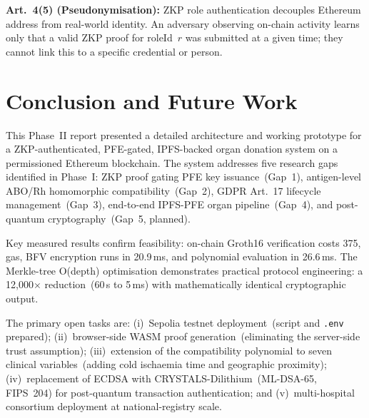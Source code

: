 \documentclass[10pt,twocolumn,a4paper]{article}
\begin{document}
\textbf{Art.~4(5) (Pseudonymisation):} ZKP role authentication decouples Ethereum
address from real-world identity. An adversary observing on-chain activity learns only
that a valid ZKP proof for roleId~$r$ was submitted at a given time; they cannot link
this to a specific credential or person.

\section{Conclusion and Future Work}
\label{sec:conclusion}

This Phase~II report presented a detailed architecture and working prototype for a
ZKP-authenticated, PFE-gated, IPFS-backed organ donation system on a permissioned
Ethereum blockchain. The system addresses five research gaps identified in Phase~I:
ZKP proof gating PFE key issuance~(Gap~1), antigen-level ABO/Rh homomorphic
compatibility~(Gap~2), GDPR Art.~17 lifecycle management~(Gap~3), end-to-end
IPFS-PFE organ pipeline~(Gap~4), and post-quantum cryptography~(Gap~5, planned).

Key measured results confirm feasibility: on-chain Groth16 verification costs
375, gas, BFV encryption runs in 20.9\,ms, and polynomial evaluation in 26.6\,ms.
The Merkle-tree O(depth) optimisation demonstrates practical protocol engineering:
a 12{,}000$\times$ reduction~(60\,s to 5\,ms) with mathematically identical
cryptographic output.

The primary open tasks are: (i)~Sepolia testnet deployment~(script and \texttt{.env}
prepared); (ii)~browser-side WASM proof generation~(eliminating the server-side trust
assumption); (iii)~extension of the compatibility polynomial to seven clinical
variables~(adding cold ischaemia time and geographic proximity);
(iv)~replacement of ECDSA with CRYSTALS-Dilithium~(ML-DSA-65, FIPS~204) for
post-quantum transaction authentication; and (v)~multi-hospital consortium deployment
at national-registry scale.



\end{document}
